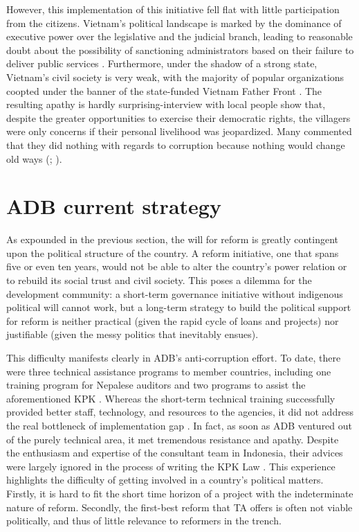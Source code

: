 \documentclass[12pt]{article}
\begin{document}
However, this implementation of this initiative fell flat with little participation from the citizens. Vietnam's political landscape is marked by the dominance of executive power over the legislative and the judicial branch, leading to reasonable doubt about the possibility of sanctioning administrators based on their failure to deliver public services \citep{Vasavakul2002}. Furthermore, under the shadow of a strong state, Vietnam's civil society is very weak, with the majority of popular organizations coopted under the banner of the state-funded Vietnam Father Front \citep[3]{Thayer2009}. The resulting apathy is hardly surprising-interview with local people show that, despite the greater opportunities to exercise their democratic rights, the villagers were only concerns if their personal livelihood was jeopardized. Many commented that they did nothing with regards to corruption because nothing would change old ways (\citealp[28]{Duong2004}; \citealp{Fritzen2005}).

\section{ADB current strategy}
\label{sec:currentstrategy}

As expounded in the previous section, the will for reform is greatly contingent upon the political structure of the country. A reform initiative, one that spans five or even ten years, would not be able to alter the country's power relation or to rebuild its social trust and civil society. This poses a dilemma for the development community: a short-term governance initiative without indigenous political will cannot work, but a long-term strategy to build the political support for reform is neither practical (given the rapid cycle of loans and projects) nor justifiable (given the messy politics that inevitably ensues).

This difficulty manifests clearly in ADB's anti-corruption effort. To date, there were three technical assistance programs to member countries, including one training program for Nepalese auditors and two programs to assist the aforementioned KPK \citep{ADB2003, ADB2005, ADB2011}. Whereas the short-term technical training successfully provided better staff, technology, and resources to the agencies, it did not address the real bottleneck of implementation gap \citep{GlobalIntegrity2012}. In fact, as soon as ADB ventured out of the purely technical area, it met tremendous resistance and apathy. Despite the enthusiasm and expertise of the consultant team in Indonesia, their advices were largely ignored in the process of writing the KPK Law \citep{ADB2003, Schutte2012}. This experience highlights the difficulty of getting involved in a country's political matters. Firstly, it is hard to fit the short time horizon of a project with the indeterminate nature of reform. Secondly, the first-best reform that TA offers is often not viable politically, and thus of little relevance to reformers in the trench.
\end{document}
